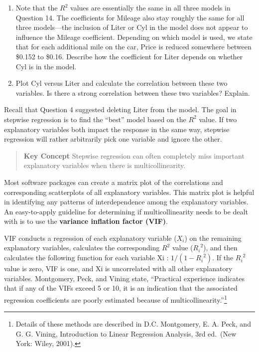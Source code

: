 \documentclass[
]{report}
\begin{document}
\begin{enumerate}
\def\labelenumi{\arabic{enumi}.}
\setcounter{enumi}{14}
\item
  Note that the \(R^2\) values are essentially the same in all three models in Question 14. The coefficients for Mileage also stay roughly the same for all three models---the inclusion of Liter or Cyl in the model does not appear to influence the Mileage coefficient. Depending on which model is used, we state that for each additional mile on the car, Price is reduced somewhere between \$0.152 to \$0.16. Describe how the coefficient for Liter depends on whether Cyl is in the model.
\item
  Plot Cyl versus Liter and calculate the correlation between these two variables. Is there a strong correlation between these two variables? Explain.
\end{enumerate}

Recall that Question 4 suggested deleting Liter from the model. The goal in stepwise regression is to find the ``best'' model based on the \(R^2\) value. If two explanatory variables both impact the response in the same way, stepwise regression will rather arbitrarily pick one variable and ignore the other.

\begin{quote}
\textbf{Key Concept}
Stepwise regression can often completely miss important explanatory variables when there is multicollinearity.
\end{quote}

Most software packages can create a matrix plot of the correlations and corresponding scatterplots of all explanatory variables. This matrix plot is helpful in identifying any patterns of interdependence among the explanatory variables. An easy-to-apply guideline for determining if multicollinearity needs to be dealt with is to use the \textbf{variance inflation factor (VIF)}.

VIF conducts a regression of each explanatory variable (\(X_i\)) on the remaining explanatory variables, calculates the corresponding \(R^2\) value (\({R_i}^2\)), and then calculates the following function for each variable Xi : \(1/(1 - {R_i}^2)\). If the \({R_i}^2\) value is zero, VIF is one, and Xi is uncorrelated with all other explanatory variables. Montgomery, Peck, and Vining state, ``Practical experience indicates that if any of the VIFs exceed 5 or 10, it is an indication that the associated regression coefficients are poorly estimated because of multicollinearity.''\footnote{Details of these methods are described in D.C. Montgomery, E. A. Peck, and G. G. Vining, Introduction to Linear Regression Analysis, 3rd ed.~(New York: Wiley, 2001).}
\end{document}
